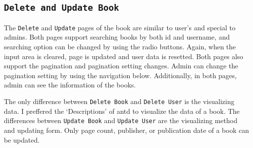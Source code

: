 \subsection{\texttt{Delete and Update Book}}

The \texttt{Delete} and \texttt{Update} pages of the book are similar to user's and special to admins. Both pages support searching books by both id and username, and searching option can be changed by using the radio buttons. Again, when the input area is cleared, page is updated and user data is resetted. Both pages also support the pagination and pagination setting changes. Admin can change the pagination setting by using the navigation below. Additionally, in both pages, admin can see the information of the books.

The only difference between \texttt{Delete Book} and \texttt{Delete User} is the visualizing data. I preffered the `Descriptions' of antd to visualize the data of a book. The differences between \texttt{Update Book} and \texttt{Update User} are the visualizing method and updating form. Only page count, publisher, or publication date of a book can be updated.

